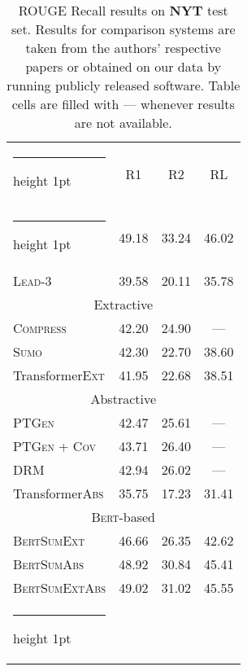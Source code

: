 \documentclass[11pt,a4paper]{article}
\makeatletter
\newcommand{\thickhline}{\noalign {\ifnum 0=`}\fi \hrule height 1pt
    \futurelet \reserved@a \@xhline
}
\makeatother
\begin{document}
    
    \begin{table}[t]
        \center
        \renewcommand{\arraystretch}{1.1}
        \begin{small}
            \begin{tabular}{lccc@{}} \thickhline
                \multicolumn{1}{l|}{Model}                                   & R1    & R2    & RL    \\ \thickhline
                \multicolumn{1}{l|}{\textsc{Oracle}}                                  &49.18& 33.24& 46.02 \\
                \multicolumn{1}{l|}{\textsc{Lead-3}}                                   & 39.58& 20.11 &35.78 \\ \hline
                \multicolumn{4}{c}{Extractive}                                                       \\\hline
                \multicolumn{1}{l|}{\textsc{Compress} \cite{durrett2016learning}}& 42.20  &24.90  &  --- \\ 
                \multicolumn{1}{l|}{\textsc{Sumo} \cite{yang19sumo}} &42.30& 22.70 &38.60 \\ 
                \multicolumn{1}{l|}{Transformer\textsc{Ext} }& 41.95 &22.68&38.51\\ \hline
                \multicolumn{4}{c}{Abstractive}                                                      \\ \hline
                
                \multicolumn{1}{l|}{\textsc{PTGen} \cite{see-acl17}      }             & 42.47 &  25.61 & --- \\
                \multicolumn{1}{l|}{\textsc{PTGen} + \textsc{Cov}  \cite{see-acl17}    }             & 43.71 &  26.40 & --- \\
                \multicolumn{1}{l|}{\textsc{DRM}   \cite{paulus2017deep}
                }             & 42.94 &  26.02 & --- \\
\multicolumn{1}{l|}{Transformer\textsc{Abs}}& 35.75 &17.23&31.41\\ 
                \hline
                \multicolumn{4}{c}{\textsc{Bert}-based}                                                       \\ \hline
                \multicolumn{1}{l|}{\textsc{BertSumExt} }                             & 46.66 &26.35& 42.62 \\
                \multicolumn{1}{l|}{\textsc{BertSumAbs}}                              & 48.92   &30.84  &45.41\\
                \multicolumn{1}{l|}{\textsc{BertSumExtAbs} }
                
                & 49.02 &31.02& 45.55 \\ \thickhline
            \end{tabular}
        \end{small}
        \caption{\label{tab:nyt} ROUGE Recall results on  \textbf{NYT} test set. Results for comparison systems are
            taken from the authors' respective papers or obtained on our data by running publicly released software. Table
            cells are filled with --- whenever results are not available.} 
    \end{table}
    
\end{document}
